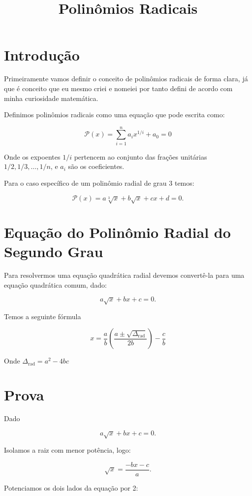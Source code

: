 \documentclass{article}
\title{Polinômios Radicais}
\author{}
\date{}
\begin{document}
\maketitle

\section{Introdução}

Primeiramente vamos definir o conceito de polinômios radicais de forma clara, já que é conceito que eu mesmo criei e nomeiei por tanto defini de acordo com minha curiosidade matemática.

Definimos polinômios radicais como uma equação que pode escrita como: 

\[
\mathcal{P}(x) = \sum_{i=1}^{n} a_i x^{1/i} + a_0 = 0
\]

Onde os expoentes $1/i$ pertencem ao conjunto das frações unitárias $1/2, 1/3, \dots, 1/n$, e $a_i$ são os coeficientes. 

Para o caso específico de um polinômio radial de grau 3 temos:

\[
\mathcal{P}(x) = a\sqrt[3]{x} + b\sqrt{x} + cx + d = 0.
\]

\section{Equação do Polinômio Radial do Segundo Grau}

Para resolvermos uma equação quadrática radial devemos convertê-la para uma equação quadrática comum, dado:

\[
a\sqrt{x} + bx + c = 0.
\]

Temos a seguinte fórmula

\[
x = \frac{a}{b}\left(\frac{a \pm \sqrt{\Delta_{\text{rad}}}}{2b}\right)- \frac{c}{b}
\]

Onde $\Delta_{\text{rad}}= a^2-4bc$

\clearpage

\section{Prova}

Dado

\[
a\sqrt{x} + bx + c = 0.
\]

Isolamos a raiz com menor potência, logo:

\[
\sqrt{x}= \frac{-bx - c}{a}.
\]

Potenciamos os dois lados da equação por 2:
\end{document}
